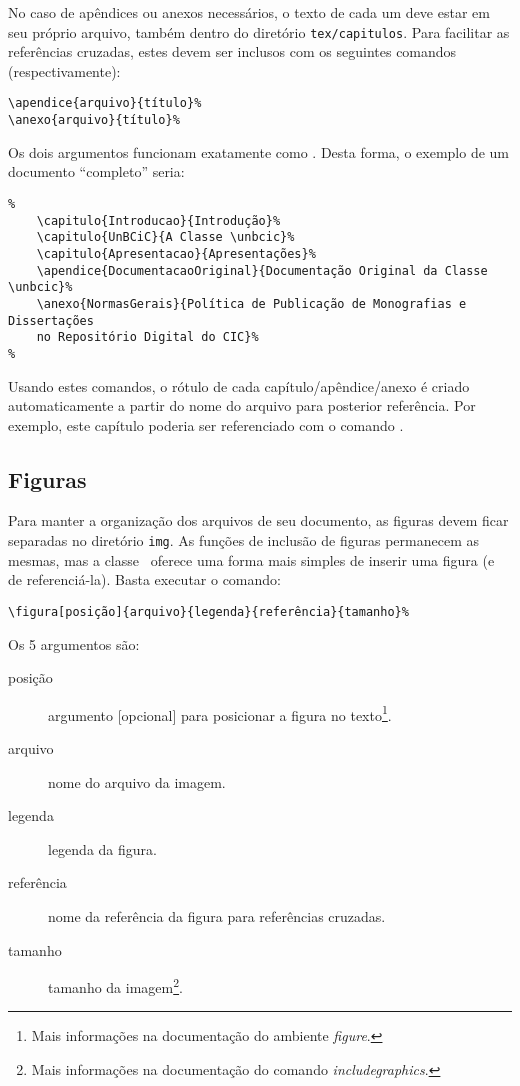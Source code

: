 No caso de apêndices ou anexos necessários, o texto de cada um deve estar em seu 
próprio arquivo, também dentro do diretório \texttt{tex/capitulos}. Para facilitar
as referências cruzadas, estes devem ser inclusos com os seguintes comandos 
(respectivamente):
\begin{verbatim}
\apendice{arquivo}{título}%
\anexo{arquivo}{título}%
\end{verbatim}

Os dois argumentos funcionam exatamente como . Desta forma,
o exemplo de um documento ``completo'' seria: %

\begin{verbatim}
%
    \capitulo{Introducao}{Introdução}% 
    \capitulo{UnBCiC}{A Classe \unbcic}%
    \capitulo{Apresentacao}{Apresentações}%
    \apendice{DocumentacaoOriginal}{Documentação Original da Classe \unbcic}%
    \anexo{NormasGerais}{Política de Publicação de Monografias e Dissertações 
    no Repositório Digital do CIC}%
%
\end{verbatim}

Usando estes comandos, o rótulo de cada capítulo/apêndice/anexo é criado 
automaticamente a partir do nome do arquivo para posterior referência. Por exemplo,
este capítulo poderia ser referenciado com o comando .

\subsection{Figuras}
Para manter a organização dos arquivos de seu documento, as figuras devem ficar 
separadas no diretório \texttt{img}. As funções de inclusão de figuras permanecem 
as mesmas, mas a classe \unbcic\ oferece uma forma mais simples de inserir uma 
figura (e de referenciá-la). Basta executar o comando:

\begin{verbatim}
\figura[posição]{arquivo}{legenda}{referência}{tamanho}%
\end{verbatim}

Os 5 argumentos são:
\begin{description}
\item[posição] argumento [opcional] para posicionar a figura no texto\footnote{Mais 
informações na documentação do ambiente \emph{figure}.}.
\item[arquivo] nome do arquivo da imagem.
\item[legenda] legenda da figura.
\item[referência] nome da referência da figura para referências cruzadas.
\item[tamanho] tamanho da imagem\footnote{Mais informações na documentação do comando 
\emph{includegraphics}.}.
\end{description}

